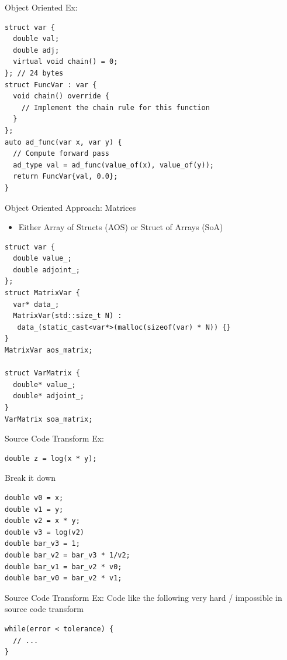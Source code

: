 \documentclass[dvipsnames]{beamer}
\begin{document}
\begin{frame}[fragile]{Object Oriented Ex:}
\begin{verbatim}
struct var {
  double val;
  double adj;
  virtual void chain() = 0;
}; // 24 bytes
struct FuncVar : var {
  void chain() override {
    // Implement the chain rule for this function
  }
};
auto ad_func(var x, var y) {
  // Compute forward pass
  ad_type val = ad_func(value_of(x), value_of(y));
  return FuncVar{val, 0.0};
}
\end{verbatim}
\end{frame}

\begin{frame}[fragile]{Object Oriented Approach: Matrices}
\begin{itemize}
    \item Either Array of Structs (AOS) or Struct of Arrays (SoA)
\end{itemize}

\begin{verbatim}
struct var {
  double value_;
  double adjoint_;
};
struct MatrixVar {
  var* data_;
  MatrixVar(std::size_t N) : 
   data_(static_cast<var*>(malloc(sizeof(var) * N)) {}
}
MatrixVar aos_matrix;

struct VarMatrix {
  double* value_;
  double* adjoint_;
}
VarMatrix soa_matrix;
\end{verbatim}
\end{frame}

\begin{frame}[fragile]{Source Code Transform Ex:}
\begin{verbatim}
double z = log(x * y);
\end{verbatim}
Break it down 
\begin{verbatim}
double v0 = x;
double v1 = y;
double v2 = x * y;
double v3 = log(v2)
double bar_v3 = 1;
double bar_v2 = bar_v3 * 1/v2;
double bar_v1 = bar_v2 * v0;
double bar_v0 = bar_v2 * v1;
\end{verbatim}
\end{frame}

\begin{frame}[fragile]{Source Code Transform Ex:}
Code like the following very hard / impossible in source code transform
\begin{verbatim}
while(error < tolerance) {
  // ...
}
\end{verbatim}
\end{frame}
\end{document}
